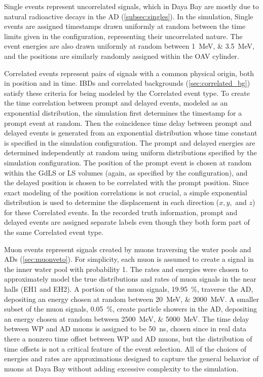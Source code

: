 Single events represent uncorrelated signals,
which in Daya Bay are mostly due to natural radioactive decays in the AD
(\cref{subsec:singles}).
In the simulation, Single events are assigned timestamps
drawn uniformly at random between the time limits given in the configuration,
representing their uncorrelated nature.
The event energies are also drawn uniformly at random
between \SIlist{1;3.5}{\MeV},
and the positions are similarly randomly assigned
within the OAV cylinder.

Correlated events represent pairs of signals
with a common physical origin, both in position and in time.
IBDs and correlated backgrounds (\cref{sec:correlated_bg})
satisfy these criteria for being modeled by the Correlated event type.
To create the time correlation between prompt and delayed events,
modeled as an exponential distribution,
the simulation first determines the timestamp for a prompt event at random.
Then the coincidence time delay between prompt and delayed events is generated
from an exponential distribution
whose time constant is specified in the simulation configuration.
The prompt and delayed energies are determined independently at random
using uniform distributions specified by the simulation configuration.
The position of the prompt event is chosen at random
within the GdLS or LS volumes (again, as specified by the configuration),
and the delayed position is chosen to be correlated with the prompt position.
Since exact modeling of the position correlations is not crucial,
a simple exponential distribution is used to determine the displacement
in each direction ($x,y,$ and $z$) for these Correlated events.
In the recorded truth information,
prompt and delayed events are assigned separate labels
even though they both form part of the same Correlated event type.

Muon events represent signals created by muons traversing
the water pools and ADs (\cref{sec:muonveto}).
For simplicity, each muon is assumed to create a signal
in the inner water pool with probability \num{1}.
The rates and energies were chosen to approximately model
the true distributions and rates of muon signals in the near halls (EH1 and EH2).
A portion of the muon signals, \SI{19.95}{\percent},
traverse the AD, depositing an energy chosen at random between
\SIlist{20;2000}{\MeV}.
A smaller subset of the muon signals, \SI{0.05}{\percent},
create particle showers in the AD, depositing an energy chosen at random between
\SIlist{2500;5000}{\MeV}.
The time delay between WP and AD muons is assigned to be \SI{50}{\ns},
chosen since in real data there a nonzero time offset between WP and AD muons,
but the distribution of time offsets
is not a critical feature of the event selection.
All of the choices of energies and rates are approximations
designed to capture the general behavior of muons at Daya Bay
without adding excessive complexity to the simulation.

